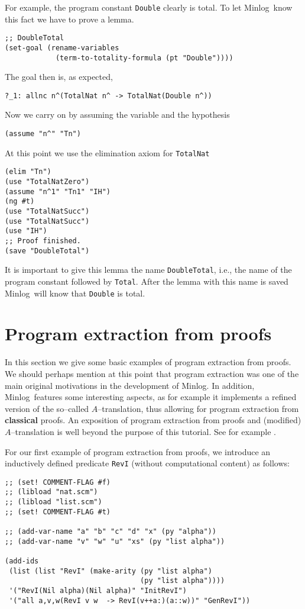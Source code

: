\documentclass[12pt]{amsart}
\newcommand{\mi}{Minlog}
\begin{document}
For example, the program constant \texttt{Double} clearly is total.
To let \mi\ know this fact we have to prove a lemma.
\begin{verbatim}
;; DoubleTotal
(set-goal (rename-variables
            (term-to-totality-formula (pt "Double"))))
\end{verbatim}
The goal then is, as expected,
\begin{verbatim}
?_1: allnc n^(TotalNat n^ -> TotalNat(Double n^))
\end{verbatim}
Now we carry on by assuming the variable and the hypothesis
\begin{verbatim}
(assume "n^" "Tn")
\end{verbatim}
At this point we use the elimination axiom for \texttt{TotalNat}
\begin{verbatim}
(elim "Tn")
(use "TotalNatZero")
(assume "n^1" "Tn1" "IH")
(ng #t)
(use "TotalNatSucc")
(use "TotalNatSucc")
(use "IH")
;; Proof finished.
(save "DoubleTotal")
\end{verbatim}
It is important to give this lemma the name \texttt{DoubleTotal},
i.e., the name of the program constant followed by \texttt{Total}.
After the lemma with this name is saved \mi\ will know that
\texttt{Double} is total.

\section{Program extraction from proofs}
\label{RevI}
In this section we give some basic examples of program extraction from
proofs.  We should perhaps mention at this point that program
extraction was one of the main original motivations in the development
of \mi.  In addition, \mi\ features some interesting aspects, as for
example it implements a refined version of the so--called
$A$--translation, thus allowing for program extraction from
\textbf{classical} proofs.  An exposition of program extraction from
proofs and (modified) $A$--translation is well beyond the purpose of
this tutorial.  See for example \cite{BergerBuchholzSchwichtenberg02,%
  BenlBergerSchwichtenbergSeisenbergerZuber98,%
  SchwichtenbergWainer12}.

For our first example of program extraction from proofs, we introduce
an inductively defined predicate \texttt{RevI} (without computational
content) as follows:
\begin{verbatim}
;; (set! COMMENT-FLAG #f)
;; (libload "nat.scm")
;; (libload "list.scm")
;; (set! COMMENT-FLAG #t)

;; (add-var-name "a" "b" "c" "d" "x" (py "alpha"))
;; (add-var-name "v" "w" "u" "xs" (py "list alpha"))

(add-ids
 (list (list "RevI" (make-arity (py "list alpha")
                                (py "list alpha"))))
 '("RevI(Nil alpha)(Nil alpha)" "InitRevI")
 '("all a,v,w(RevI v w  -> RevI(v++a:)(a::w))" "GenRevI"))
\end{verbatim}
\end{document}
